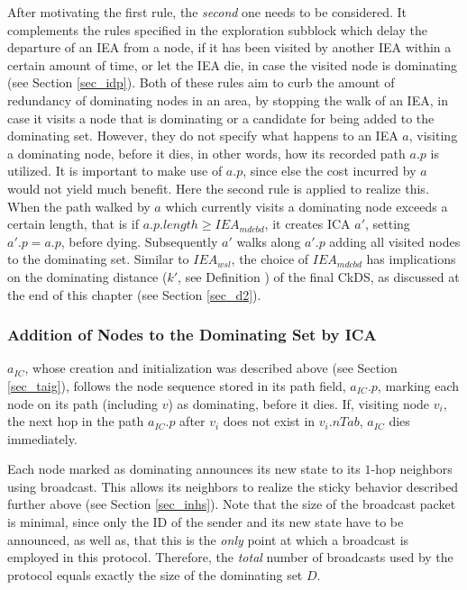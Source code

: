 After motivating the first rule, the \emph{second} one needs to be considered. It complements the rules specified in the exploration subblock which delay the departure of an IEA from a node, if it has been visited by another IEA within a certain amount of time, or let the IEA die, in case the visited node is dominating (see Section \ref{sec_idp}). Both of these rules aim to curb the amount of redundancy of dominating nodes in an area, by stopping the walk of an IEA, in case it visits a node that is dominating or a candidate for being added to the dominating set. However, they do not specify what happens to an IEA $a$, visiting a dominating node, before it dies, in other words, how its recorded path $a.p$ is utilized. It is important to make use of $a.p$, since else the cost incurred by $a$ would not yield much benefit. Here the second rule is applied to realize this. When the path walked by $a$ which currently visits a dominating node exceeds a certain length, that is if $a.p.length \geq IEA_{mdcbd}$, it creates ICA $a'$, setting $a'.p=a.p$, before dying. Subsequently $a'$ walks along $a'.p$ adding all visited nodes to the dominating set. Similar to $IEA_{wsl}$, the choice of $IEA_{mdcbd}$ has implications on the dominating distance ($k'$, see Definition ) of the final CkDS, as discussed at the end of this chapter (see Section \ref{sec_d2}).




\subsubsection{Addition of Nodes to the Dominating Set by ICA}\label{sec_aont}

$a_{IC}$, whose creation and initialization was described above (see Section \ref{sec_taig}), follows the node sequence stored in its path field, $a_{IC}.p$, marking each node on its path (including $v$) as dominating, before it dies. If, visiting node $v_i$, the next hop in the path $a_{IC}.p$ after $v_i$ does not exist in $v_i.nTab$, $a_{IC}$ dies immediately. 

Each node marked as dominating announces its new state to its $1$-hop neighbors using broadcast. This allows its neighbors to realize the sticky behavior described further above (see Section \ref{sec_inhs}). Note that the size of the broadcast packet is minimal, since only the ID of the sender and its new state have to be announced, as well as, that this is the \emph{only} point at which a broadcast is employed in this protocol. Therefore, the \emph{total} number of broadcasts used by the protocol equals exactly the size of the dominating set $D$.

